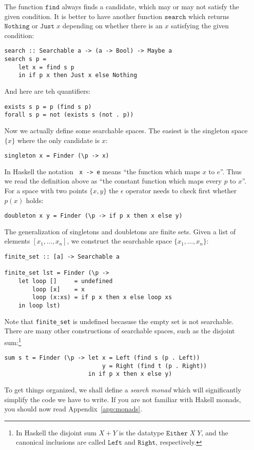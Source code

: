 \documentclass[a4paper,10pt]{article}
\newcommand{\set}[1]{\{#1\}}
\begin{document}
The function $\mathtt{find}$ always finds a candidate, which may or may not satisfy the given condition. It is better to have another function $\mathtt{search}$ which returns $\mathtt{Nothing}$ or $\mathtt{Just}\;x$ depending on whether there is an $x$ satisfying the given condition:
%
\begin{lstlisting}
search :: Searchable a -> (a -> Bool) -> Maybe a
search s p =
    let x = find s p
    in if p x then Just x else Nothing
\end{lstlisting}
%
And here are teh quantifiers:
%
\begin{lstlisting}
exists s p = p (find s p)
forall s p = not (exists s (not . p))
\end{lstlisting}
%
Now we actually define some searchable spaces. The easiest is the singleton space $\set{x}$ where the only candidate is $x$:
%
\begin{lstlisting}
singleton x = Finder (\p -> x)
\end{lstlisting}
%
In Haskell the notation \texttt{ x -> e} means ``the function which maps $x$ to $e$''. Thus we read the definition above as ``the constant function which maps every $p$ to $x$''.
%
For a space with two points $\set{x, y}$ the $\epsilon$ operator needs to check first whether $p(x)$ holds:
%
\begin{lstlisting}
doubleton x y = Finder (\p -> if p x then x else y)
\end{lstlisting}
%
The generalization of singletons and doubletons are finite sets. Given a list of elements $[x_1, \ldots, x_n]$, we construct the searchable space $\set{x_1, \ldots, x_n}$:
%
\begin{lstlisting}
finite_set :: [a] -> Searchable a

finite_set lst = Finder (\p ->
    let loop []     = undefined
        loop [x]    = x
        loop (x:xs) = if p x then x else loop xs
    in loop lst)
\end{lstlisting}
%
Note that \texttt{finite\_set\;[]} is undefined becasuse the empty set is not searchable.
%
There are many other constructions of searchable spaces, such as the disjoint sum:\footnote{In   Haskell the disjoint sum $X + Y$ is the datatype $\mathtt{Either}\;X\;Y$, and the canonical   inclusions are called $\mathtt{Left}$ and $\mathtt{Right}$, respectively.}
%
\begin{lstlisting}
sum s t = Finder (\p -> let x = Left (find s (p . Left))
                            y = Right (find t (p . Right))
                        in if p x then x else y)
\end{lstlisting}
%
To get things organized, we shall define a \emph{search monad} which will significantly simplify the code we have to write. If you are not familiar with Hakell monads, you should now read Appendix~\ref{app:monads}.
\end{document}
